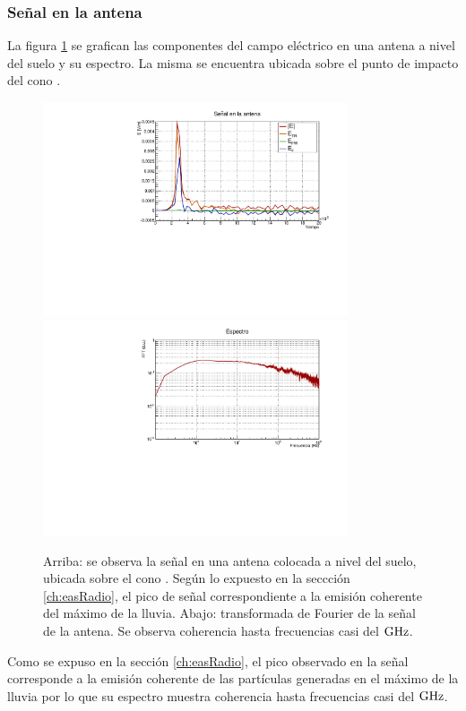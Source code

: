 	\subsubsection{Señal en la antena}
	La figura \ref{fig:antSig} se grafican las componentes del campo eléctrico en una antena a nivel del suelo y su espectro. La misma se encuentra ubicada sobre el punto de impacto del cono \cher{}.
	\begin{figure}[ht!]
		\centering
		\includegraphics[width=0.8\textwidth]{./fig/simulacionRadio/antennaSignal}\\
		\includegraphics[width=0.8\textwidth]{./fig/simulacionRadio/antennaSpec}
		\caption{\label{fig:antSig}
		Arriba: se observa la señal en una antena colocada a nivel del suelo, ubicada sobre el cono \cher{}. Según lo expuesto en la seccción \ref{ch:easRadio}, el pico de señal correspondiente a la emisión coherente del máximo de la lluvia.
		Abajo: transformada de Fourier de la señal de la antena. Se observa coherencia hasta frecuencias casi del $\rm GHz$.
		}
	\end{figure}
	Como se expuso en la sección \ref{ch:easRadio}, el pico observado en la señal corresponde a la emisión coherente de las partículas generadas en el máximo de la lluvia por lo que su espectro muestra coherencia hasta frecuencias casi del $\rm GHz$.
	
